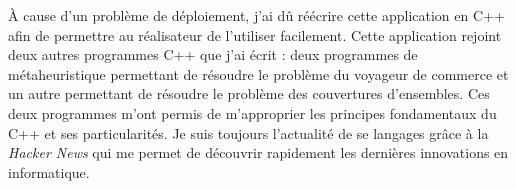 À cause d'un problème de déploiement, j'ai dû réécrire cette application en C++ afin de permettre au réalisateur de l'utiliser facilement. Cette application rejoint deux autres programmes C++ que j'ai écrit : deux programmes de métaheuristique permettant de résoudre le problème du voyageur de commerce et un autre permettant de résoudre le problème des couvertures d'ensembles. Ces deux programmes m'ont permis de m'approprier les principes fondamentaux du C++ et ses particularités. Je suis toujours l'actualité de se langages grâce à la \textit{Hacker News} qui me permet de découvrir rapidement les dernières innovations en informatique.
\conclusion{}

\makeletterclosing

